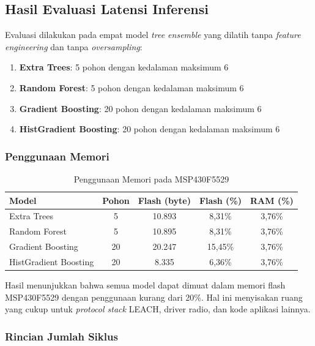 \subsection{Hasil Evaluasi Latensi Inferensi}

Evaluasi dilakukan pada empat model \textit{tree ensemble} yang dilatih tanpa \textit{feature engineering} dan tanpa \textit{oversampling}:

\begin{enumerate}
    \item \textbf{Extra Trees}: 5 pohon dengan kedalaman maksimum 6
    \item \textbf{Random Forest}: 5 pohon dengan kedalaman maksimum 6
    \item \textbf{Gradient Boosting}: 20 pohon dengan kedalaman maksimum 6
    \item \textbf{HistGradient Boosting}: 20 pohon dengan kedalaman maksimum 6
\end{enumerate}

\subsubsection{Penggunaan Memori}

\begin{table}[htbp]
\centering
\caption{Penggunaan Memori pada MSP430F5529}
\label{tab:msp430_memory_id}
\begin{tabular}{lcccc}
\hline
\textbf{Model} & \textbf{Pohon} & \textbf{Flash (byte)} & \textbf{Flash (\%)} & \textbf{RAM (\%)} \\
\hline
Extra Trees & 5 & 10.893 & 8,31\% & 3,76\% \\
Random Forest & 5 & 10.895 & 8,31\% & 3,76\% \\
Gradient Boosting & 20 & 20.247 & 15,45\% & 3,76\% \\
HistGradient Boosting & 20 & 8.335 & 6,36\% & 3,76\% \\
\hline
\end{tabular}
\end{table}

Hasil menunjukkan bahwa semua model dapat dimuat dalam memori flash MSP430F5529 dengan penggunaan kurang dari 20\%. Hal ini menyisakan ruang yang cukup untuk \textit{protocol stack} LEACH, driver radio, dan kode aplikasi lainnya.

\subsubsection{Rincian Jumlah Siklus}

